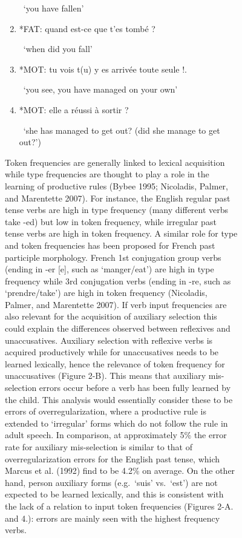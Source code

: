 \documentclass[
  12pt,
]{article}
\begin{document}
\begin{enumerate}[resume*]
\begin{enumerate}[resume*]
\begin{enumerate}[resume*]
\begin{enumerate}[resume*]
\begin{enumerate}[resume*]
\begin{enumerate}[resume*]
    \     `you have fallen'
  \item{*FAT:   quand est-ce que t'es tombé ? \label{ex:semantics-4}}
    
    \     `when did you fall'
  \item{*MOT:   tu vois t(u) y es arrivée toute seule !.  \label{ex:semantics-2}}
    
    \     `you see, you have managed on your own'
   \item{*MOT:  elle a réussi à sortir ?  \label{ex:semantics-3}}
    
    \     `she has managed to get out? (did she manage to get out?')  
\end{enumerate}

Token frequencies are generally linked to lexical acquisition while type frequencies are thought to play a role in the learning of productive rules (Bybee 1995; Nicoladis, Palmer, and Marentette 2007). For instance, the English regular past tense verbs are high in type frequency (many different verbs take -ed) but low in token frequency, while irregular past tense verbs are high in token frequency. A similar role for type and token frequencies has been proposed for French past participle morphology. French 1st conjugation group verbs (ending in -er {[}e{]}, such as `manger/eat') are high in type frequency while 3rd conjugation verbs (ending in -re, such as `prendre/take') are high in token frequency (Nicoladis, Palmer, and Marentette 2007). If verb input frequencies are also relevant for the acquisition of auxiliary selection this could explain the differences observed between reflexives and unaccusatives. Auxiliary selection with reflexive verbs is acquired productively while for unaccusatives needs to be learned lexically, hence the relevance of token frequency for unaccusatives (Figure 2-B). This means that auxiliary mis-selection errors occur before a verb has been fully learned by the child. This analysis would essentially consider these to be errors of overregularization, where a productive rule is extended to `irregular' forms which do not follow the rule in adult speech. In comparison, at approximately 5\% the error rate for auxiliary mis-selection is similar to that of overregularization errors for the English past tense, which Marcus et al. (1992) find to be 4.2\% on average. On the other hand, person auxiliary forms (e.g.~`suis' vs.~`est') are not expected to be learned lexically, and this is consistent with the lack of a relation to input token frequencies (Figures 2-A. and 4.): errors are mainly seen with the highest frequency verbs.


\end{enumerate}
\end{enumerate}
\end{enumerate}
\end{enumerate}
\end{enumerate}
\end{document}
